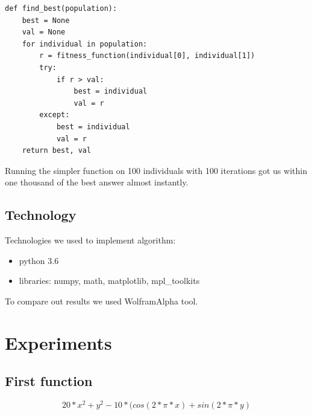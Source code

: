 \documentclass[a4paper, 12pt]{article}
\begin{document}
\begin{lstlisting}
def find_best(population):
	best = None
	val = None
	for individual in population:
		r = fitness_function(individual[0], individual[1])
		try:
			if r > val:
				best = individual
				val = r
		except:
			best = individual
			val = r
	return best, val
\end{lstlisting}


Running the simpler function on 100 individuals with 100 iterations got us within one thousand of the best answer almost instantly.

\subsection{Technology}

Technologies we used to implement algorithm:
\begin{itemize}
	\item python 3.6
	\item libraries: numpy, math, matplotlib, mpl\_toolkits
\end{itemize}

To compare out results we used WolframAlpha tool. 

\section{Experiments}

\subsection{First function}

 \[20*x^2 + y^2 - 10*(cos(2 * \pi * x) + sin(2 * \pi * y) \] 






\end{document}
